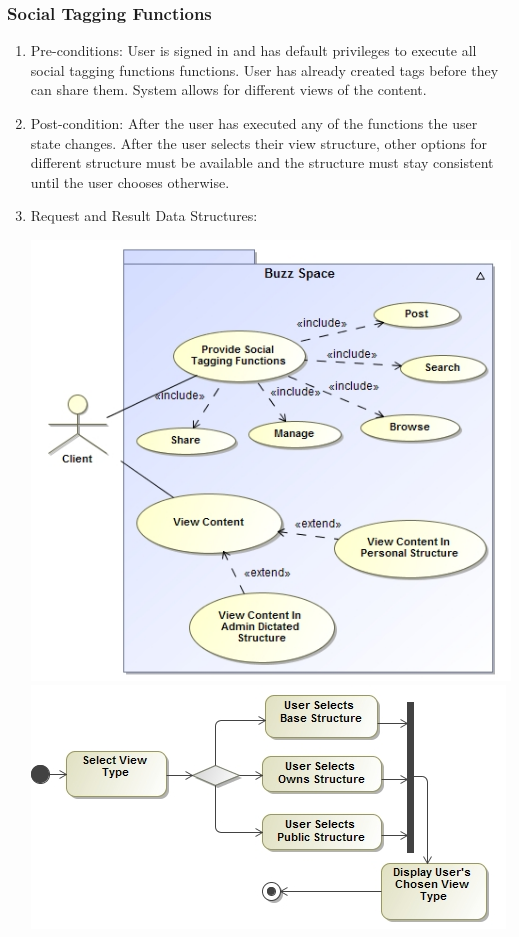 \documentclass[12pt, oneside]{article}
\begin{document}
\subsubsection{Social Tagging Functions}
\begin{enumerate}
\item Pre-conditions: User is signed in and has default privileges to execute all social tagging functions functions. User has already created tags before they can share them. System allows for different views of the content.
\item Post-condition: After the user has executed any of the functions the user state changes. After the user selects their view structure, other options for different structure must be available and the structure must stay consistent until the user chooses otherwise.
\item Request and Result Data Structures:
\begin{center}
\includegraphics[scale=0.5]{socialTagging.jpg}\\
\includegraphics[scale=0.5]{socialTaggingActivity.jpg}
\end{center}
\end{enumerate}
\end{document}
